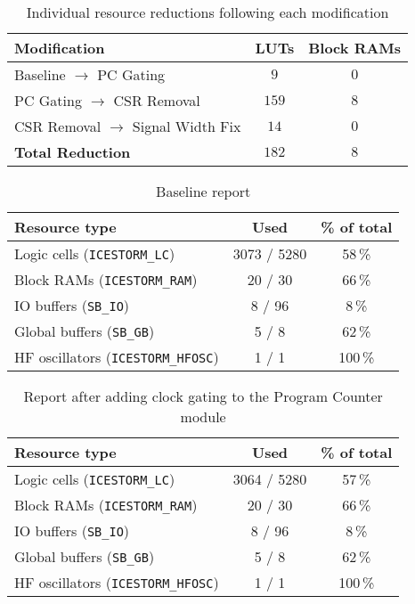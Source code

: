 \documentclass[a4paper,10pt]{article}
\begin{document}
\begin{table}[H] 
    \centering
    \begin{tabularx}{0.6\textwidth}{X c c}
        \toprule
        Modification & LUTs & Block RAMs \\ \midrule
        Baseline $\rightarrow$ PC Gating & $9$ & $0$ \\
        PC Gating $\rightarrow$ CSR Removal & $159$ & $8$ \\
        CSR Removal $\rightarrow$ Signal Width Fix & $14$ & $0$ \\ \midrule
        \textbf{Total Reduction} & \textbf{$182$} & \textbf{$8$} \\
        \bottomrule
    \end{tabularx}
    \caption{Individual resource reductions following each modification}
    \label{tab:modification_reductions}
\end{table}


\begin{table}[H] 
    \centering
    \begin{tabularx}{0.65\textwidth}{X c c}
        \toprule
        Resource type & Used & \% of total \\ \midrule
        Logic cells (\texttt{ICESTORM\_LC}) & 3073 / 5280 & 58\,\% \\
        Block RAMs (\texttt{ICESTORM\_RAM}) & 20 / 30 & 66\,\% \\
        IO buffers (\texttt{SB\_IO}) & 8 / 96 & 8\,\% \\
        Global buffers (\texttt{SB\_GB}) & 5 / 8 & 62\,\% \\
        HF oscillators (\texttt{ICESTORM\_HFOSC}) & 1 / 1 & 100\,\% \\
        \bottomrule
    \end{tabularx}
    \caption{Baseline report}
    \label{tab:baseline}
\end{table}

\begin{table}[H] 
    \centering
    \begin{tabularx}{0.65\textwidth}{X c c}
        \toprule
        Resource type & Used & \% of total \\ \midrule
        Logic cells (\texttt{ICESTORM\_LC}) & 3064 / 5280 & 57\,\% \\
        Block RAMs (\texttt{ICESTORM\_RAM}) & 20 / 30 & 66\,\% \\
        IO buffers (\texttt{SB\_IO}) & 8 / 96 & 8\,\% \\
        Global buffers (\texttt{SB\_GB}) & 5 / 8 & 62\,\% \\
        HF oscillators (\texttt{ICESTORM\_HFOSC}) & 1 / 1 & 100\,\% \\
        \bottomrule
    \end{tabularx}
    \caption{Report after adding clock gating to the Program Counter module}
    \label{tab:Program_Counter}
\end{table}
\end{document}
